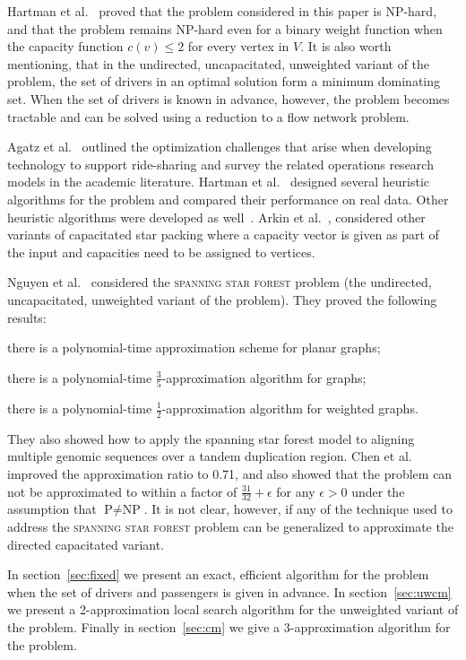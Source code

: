 Hartman et al.~\cite{hartman2013optimal} proved that the
\emph{\CARPOOL{}} problem considered in this paper is NP-hard,
and that the problem remains NP-hard even for a binary weight function when
the capacity function $c(v) \leq 2$ for every vertex in $V$.
It is also worth mentioning, that in the undirected, uncapacitated, unweighted
variant of the problem, the set of drivers in an optimal solution
form a minimum dominating set.
When the set of drivers is known in advance, however, the problem becomes
tractable and can be solved using a reduction to a flow network problem.

Agatz et al.~\cite{agatz2012optimization} outlined the optimization challenges
that arise when developing technology to support ride-sharing and survey the
related operations research models in the academic literature.  
Hartman et al.~\cite{hartman2014theory} designed several heuristic algorithms
for the \CARPOOL{} problem and compared 
their performance on real data.
Other heuristic algorithms were developed as well~\cite{knapen2014exploiting}.
Arkin et al.~\cite{arkin2004approximations}, considered other variants of
capacitated star packing where a capacity vector is given as part of the input and 
capacities need to be assigned to vertices.  

Nguyen et al.~\cite{nguyen2008approximating} considered the \textsc{spanning star forest} problem
(the undirected, uncapacitated, unweighted variant of the problem).
They proved the following results:
\begin{enumerate*}
\item
there is a polynomial-time approximation scheme for planar graphs;
\item 
there is a polynomial-time $\frac{3}{5}$-approximation algorithm for graphs;
\item 
there is a polynomial-time $\frac{1}{2}$-approximation algorithm for weighted graphs.
\end{enumerate*}
They also showed how to apply the spanning star forest model to aligning multiple
genomic sequences over a tandem duplication region.
Chen et al.~\cite{chen2007improved} improved the approximation ratio to 0.71,
and also showed that the problem can not be approximated to within a factor of
$\frac{31}{32} + \epsilon$ for any $\epsilon > 0$ under the assumption 
that $\text{P} \neq \text{NP}$.
It is not clear, however, if any of the technique used to address the
\textsc{spanning star forest} problem can be generalized to approximate the
directed capacitated variant.

In section~\ref{sec:fixed} we present an exact, efficient algorithm for the
problem when the set of drivers and passengers is given in advance.
In section~\ref{sec:uwcm} we present a 2-approximation local search algorithm
for the unweighted variant of the problem.
Finally in section~\ref{sec:cm} we
give a 3-approximation algorithm for the problem.

